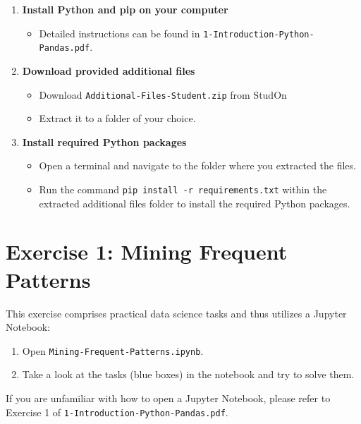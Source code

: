 \documentclass[
english,
smallborders
]{i6prcsht}
\begin{document}
\begin{enumerate}	
	\item \textbf{Install Python and pip on your computer}
	      
	      \begin{itemize}	
		      \item Detailed instructions can be found in \texttt{1-Introduction-Python-Pandas.pdf}.
	      \end{itemize}
	      
	\item \textbf{Download provided additional files}
	      
	      \begin{itemize}	
		      \item Download \texttt{Additional-Files-Student.zip} from StudOn
		      \item Extract it to a folder of your choice.
	      \end{itemize}
	      
	\item \textbf{Install required Python packages}
	      
	      \begin{itemize}	
		      \item Open a terminal and navigate to the folder where you extracted the files.
		      \item Run the command \texttt{pip install -r requirements.txt} within the extracted additional files folder to install the required Python packages.
	      \end{itemize}
	      
	      
\end{enumerate}

\section*{Exercise 1: Mining Frequent Patterns}

This exercise comprises practical data science tasks and thus utilizes a Jupyter Notebook:

\begin{enumerate}	
	\item Open \texttt{Mining-Frequent-Patterns.ipynb}.
	\item Take a look at the tasks (blue boxes) in the notebook and try to solve them.
\end{enumerate}

If you are unfamiliar with how to open a Jupyter Notebook, please refer to Exercise 1 of \texttt{1-Introduction-Python-Pandas.pdf}.
\end{document}
